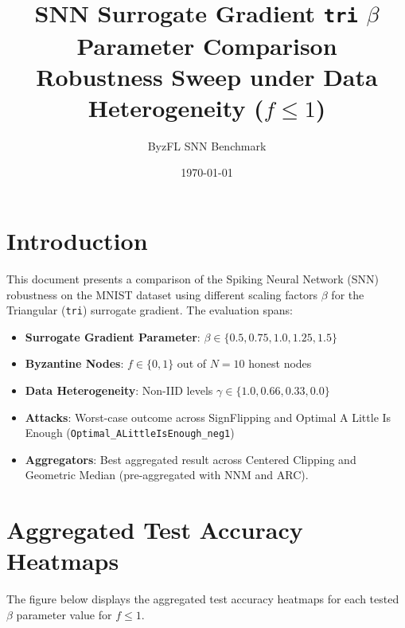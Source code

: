\documentclass{article}
\title{SNN Surrogate Gradient \texttt{tri} $\beta$ Parameter Comparison\\Robustness Sweep under Data Heterogeneity ($f \le 1$)}
\author{ByzFL SNN Benchmark}
\date{\today}
\begin{document}
\maketitle

\section{Introduction}
This document presents a comparison of the Spiking Neural Network (SNN) robustness on the MNIST dataset using different scaling factors $\beta$ for the Triangular (\texttt{tri}) surrogate gradient. The evaluation spans:
\begin{itemize}
    \item \textbf{Surrogate Gradient Parameter}: $\beta \in \{0.5, 0.75, 1.0, 1.25, 1.5\}$
    \item \textbf{Byzantine Nodes}: $f \in \{0, 1\}$ out of $N=10$ honest nodes
    \item \textbf{Data Heterogeneity}: Non-IID levels $\gamma \in \{1.0, 0.66, 0.33, 0.0\}$
    \item \textbf{Attacks}: Worst-case outcome across SignFlipping and Optimal A Little Is Enough (\texttt{Optimal\_ALittleIsEnough\_neg1})
    \item \textbf{Aggregators}: Best aggregated result across Centered Clipping and Geometric Median (pre-aggregated with NNM and ARC).
\end{itemize}

\section{Aggregated Test Accuracy Heatmaps}
The figure below displays the aggregated test accuracy heatmaps for each tested $\beta$ parameter value for $f \le 1$.
\end{document}
